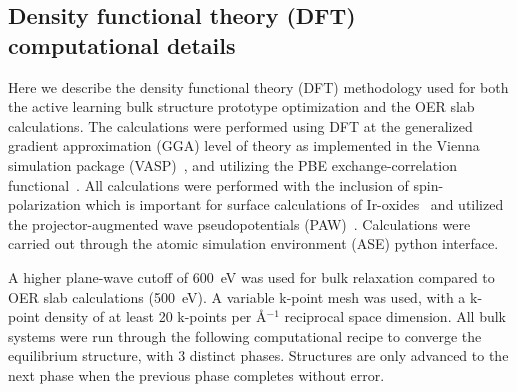 


\subsection{Density functional theory (DFT) computational details}

%
Here we describe the density functional theory (DFT) methodology used for both the active learning bulk structure prototype optimization and the OER slab calculations.
%
The calculations were performed using DFT at the generalized gradient approximation (GGA) level of theory as implemented in the Vienna  simulation package (VASP)~\cite{Kresse1995,Kresse1996_0,Kresse1996_1},
and utilizing the PBE exchange-correlation functional~\cite{Perdew1996}.
%
All calculations were performed with the inclusion of spin-polarization which is important for surface calculations of Ir-oxides~\cite{Briquet2017,Strickler2019} and utilized the projector-augmented wave pseudopotentials (PAW)~\cite{Blochl1994}.
%
Calculations were carried out through the atomic simulation environment (ASE) python interface.~\cite{HjorthLarsen2017}
%


%
%
A higher plane-wave cutoff of \SI{600}{\electronvolt} was used for bulk relaxation compared to OER slab calculations (\SI{500}{\electronvolt}).
%
A variable k-point mesh was used, with a k-point density of at least \num{20} k-points per \AA$^{-1}$ reciprocal space dimension.
%
All bulk systems were run through the following computational recipe to converge the equilibrium structure, with \num{3} distinct phases. Structures are only advanced to the next phase when the previous phase completes without error.

